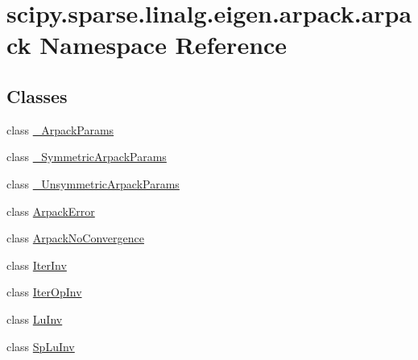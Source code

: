 \hypertarget{namespacescipy_1_1sparse_1_1linalg_1_1eigen_1_1arpack_1_1arpack}{}\section{scipy.\+sparse.\+linalg.\+eigen.\+arpack.\+arpack Namespace Reference}
\label{namespacescipy_1_1sparse_1_1linalg_1_1eigen_1_1arpack_1_1arpack}
\subsection*{Classes}
\begin{DoxyCompactItemize}
\item 
class \hyperlink{classscipy_1_1sparse_1_1linalg_1_1eigen_1_1arpack_1_1arpack_1_1__ArpackParams}{\+\_\+\+Arpack\+Params}
\item 
class \hyperlink{classscipy_1_1sparse_1_1linalg_1_1eigen_1_1arpack_1_1arpack_1_1__SymmetricArpackParams}{\+\_\+\+Symmetric\+Arpack\+Params}
\item 
class \hyperlink{classscipy_1_1sparse_1_1linalg_1_1eigen_1_1arpack_1_1arpack_1_1__UnsymmetricArpackParams}{\+\_\+\+Unsymmetric\+Arpack\+Params}
\item 
class \hyperlink{classscipy_1_1sparse_1_1linalg_1_1eigen_1_1arpack_1_1arpack_1_1ArpackError}{Arpack\+Error}
\item 
class \hyperlink{classscipy_1_1sparse_1_1linalg_1_1eigen_1_1arpack_1_1arpack_1_1ArpackNoConvergence}{Arpack\+No\+Convergence}
\item 
class \hyperlink{classscipy_1_1sparse_1_1linalg_1_1eigen_1_1arpack_1_1arpack_1_1IterInv}{Iter\+Inv}
\item 
class \hyperlink{classscipy_1_1sparse_1_1linalg_1_1eigen_1_1arpack_1_1arpack_1_1IterOpInv}{Iter\+Op\+Inv}
\item 
class \hyperlink{classscipy_1_1sparse_1_1linalg_1_1eigen_1_1arpack_1_1arpack_1_1LuInv}{Lu\+Inv}
\item 
class \hyperlink{classscipy_1_1sparse_1_1linalg_1_1eigen_1_1arpack_1_1arpack_1_1SpLuInv}{Sp\+Lu\+Inv}
\end{DoxyCompactItemize}
